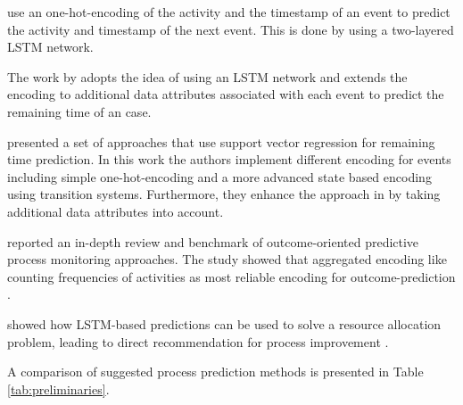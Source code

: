 \citeauthor{DBLP:conf/caise/TaxVRD17} use an one-hot-encoding of the activity and the timestamp of an event to predict the activity and timestamp of the next event.
This is done by using a two-layered LSTM network\cite{DBLP:conf/caise/TaxVRD17}.


The work by \citeauthor{DBLP:conf/ssci/NavarinVPS17} adopts the idea of using an LSTM network \cite{DBLP:conf/caise/TaxVRD17} and extends the encoding to additional data attributes associated with each event\cite{DBLP:conf/ssci/NavarinVPS17} to predict the remaining time of an case.

\citeauthor{DBLP:journals/computing/PolatoSBL18} presented a set of approaches that use support vector regression for remaining time prediction\cite{DBLP:journals/computing/PolatoSBL18}.
In this work the authors implement different encoding for events including simple one-hot-encoding and a more advanced state based encoding using transition systems.
Furthermore, they enhance the approach in  \cite{DBLP:journals/is/AalstSS11} by taking additional data attributes into account.

\citeauthor{DBLP:journals/tkdd/TeinemaaDRM19} reported an in-depth review and benchmark of outcome-oriented predictive process monitoring approaches.
The study showed that aggregated encoding like counting frequencies of activities as most reliable encoding for outcome-prediction \cite{DBLP:journals/tkdd/TeinemaaDRM19}.

\citeauthor{DBLP:conf/icpm/ParkS19} showed how LSTM-based predictions can be used to solve a resource allocation problem, leading to direct recommendation for process improvement \cite{DBLP:conf/icpm/ParkS19}.

A comparison of suggested process prediction methods is presented in Table \ref{tab:preliminaries}.

